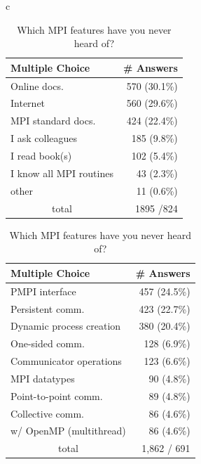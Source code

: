 \documentclass[sigconf,nonacm]{acmart}
\begin{document}
\begin{table}[htb]
\begin{center}
\begin{tabular}{c}
\hspace{1mm}
\begin{minipage}{0.24\hsize}
\begin{center}%
\caption{\footnotesize How do you check MPI specifications when you are writing MPI programs?}%
\label{tab:Q14-ans}%
\begin{tabular}{l|r}%
\hline%
Multiple Choice & \# Answers \\%
\hline%
Online docs. & 570 (30.1\%) \\%
Internet & 560 (29.6\%) \\%
MPI standard docs. & 424 (22.4\%) \\%
I ask colleagues & 185 (9.8\%) \\%
I read book(s) & 102 (5.4\%) \\%
I know all MPI routines & 43 (2.3\%) \\%
other & 11 (0.6\%) \\%
\hline%
\multicolumn{1}{c}{total} & 1895 /824 \\%
\hline%
\end{tabular}%
\end{center}%
\end{minipage}

\hspace{1mm}
\begin{minipage}{0.24\hsize}
\begin{center}
\caption{\small Which MPI features have you never heard of?}%
\label{tab:Q16-ans}%
\begin{tabular}{l|r}%
\hline%
Multiple Choice & \# Answers \\%
\hline%
PMPI interface & 457 (24.5\%) \\%
Persistent comm. & 423 (22.7\%) \\%
Dynamic process creation & 380 (20.4\%) \\%
One-sided comm. & 128 (6.9\%) \\%
Communicator operations & 123 (6.6\%) \\%
MPI datatypes & 90 (4.8\%) \\%
Point-to-point comm. & 89 (4.8\%) \\%
Collective comm. & 86 (4.6\%) \\%
w/ OpenMP (multithread) & 86 (4.6\%) \\%
\hline%
\multicolumn{1}{c}{total} & 1,862 / 691 \\%
\hline%
\end{tabular}%
\end{center}%
\end{minipage}


\end{tabular}
\end{center}
\end{table}
\end{document}
